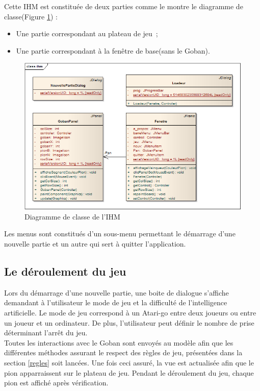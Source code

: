\documentclass[11pt,a4paper]{article}
\begin{document}
Cette IHM est constituée de deux parties comme le montre le diagramme de
classe(Figure \ref{diag_IHM}) :

	\begin{itemize}
  		\item Une partie correspondant au plateau de jeu~; 
		\item Une partie correspondant à la fenêtre de base(sans le Goban).\\
    \end{itemize}
    
    	\begin{figure}[!ht]
    	\begin{center}
			\includegraphics[scale=0.7]{diag_IHM.png}
		\end{center}
	\caption{Diagramme de classe de l'IHM}
	\label{diag_IHM}
	\end{figure}   
  

Les menus sont constitués d'un sous-menu permettant le démarrage d'une nouvelle
partie et un autre qui sert à quitter l'application. 

\subsection{Le déroulement du jeu}
Lors du démarrage d'une nouvelle partie, une boite de dialogue s'affiche
demandant à l'utilisateur le mode de jeu et la difficulté de l'intelligence artificielle.
Le mode de jeu correspond à un Atari-go entre deux joueurs ou entre un joueur
et un ordinateur. De plus, l'utilisateur peut définir le nombre de prise
déterminant l'arrêt du jeu.\\

Toutes les interactions avec le Goban sont envoyés au modèle afin que les
différentes méthodes assurant le respect des règles de jeu, présentées dans la
section \ref{regles} soit lancées. Une fois ceci assuré, la vue est
actualisée afin que le pion apparraissent sur le plateau de jeu.
Pendant le déroulement du jeu, chaque pion est affiché après vérification.
\end{document}
